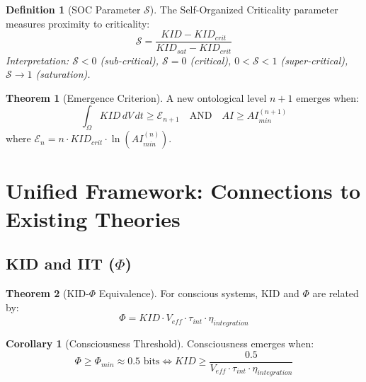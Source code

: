 \documentclass[11pt,a4paper]{article}
\theoremstyle{definition}
\newtheorem{definition}{Definition}[section]
\newtheorem{theorem}{Theorem}[section]
\newtheorem{corollary}{Corollary}[section]
\begin{document}
\begin{definition}[SOC Parameter $\mathcal{S}$]
The Self-Organized Criticality parameter measures proximity to criticality:
\begin{equation}
\mathcal{S} = \frac{KID - KID_{crit}}{KID_{sat} - KID_{crit}}
\end{equation}
\textit{Interpretation: $\mathcal{S} < 0$ (sub-critical), $\mathcal{S} = 0$ (critical), $0 < \mathcal{S} < 1$ (super-critical), $\mathcal{S} \rightarrow 1$ (saturation).}
\end{definition}

\begin{theorem}[Emergence Criterion]
A new ontological level $n+1$ emerges when:
\begin{equation}
\int_{\Omega} KID \, dV \, dt \geq \mathcal{E}_{n+1} \quad \text{AND} \quad AI \geq AI_{min}^{(n+1)}
\end{equation}
where $\mathcal{E}_n = n \cdot KID_{crit} \cdot \ln(AI_{min}^{(n)})$.
\end{theorem}

\section{Unified Framework: Connections to Existing Theories}

\subsection{KID and IIT ($\Phi$)}

\begin{theorem}[KID-$\Phi$ Equivalence]
For conscious systems, KID and $\Phi$ are related by:
\begin{equation}
\Phi = KID \cdot V_{eff} \cdot \tau_{int} \cdot \eta_{integration}
\end{equation}
\end{theorem}

\begin{corollary}[Consciousness Threshold]
Consciousness emerges when:
\begin{equation}
\Phi \geq \Phi_{min} \approx 0.5 \text{ bits} \iff KID \geq \frac{0.5}{V_{eff} \cdot \tau_{int} \cdot \eta_{integration}}
\end{equation}
\end{corollary}
\end{document}
